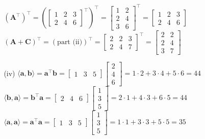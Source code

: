 \documentclass[11pt,letterpaper]{article}
\begin{document}
\begin{enumerate}
\begin{enumerate}
\begin{enumerate}
              $(\mathbf{A}^{\top})^{\top} = \left(\begin{bmatrix} 1 & 2 & 3 \\ 2 & 4 & 6 \end{bmatrix}^\top\right)^{\top} = \begin{bmatrix} 1 & 2 \\ 2 & 4 \\ 3 & 6 \end{bmatrix}^\top = \begin{bmatrix} 1 & 2 & 3 \\ 2 & 4 & 6 \end{bmatrix}$\\
              $(\mathbf{A} + \mathbf{C})^\top = \left(\text{part (ii)}\right)^\top = \begin{bmatrix} 2 & 2 & 3 \\ 2 & 4 & 7 \end{bmatrix}^\top = \begin{bmatrix} 2 & 2 \\ 2 & 4 \\ 3 & 7 \end{bmatrix}$
\item [(iv)] $\langle\mathbf{a}, \mathbf{b}\rangle = \mathbf{a}^\top\mathbf{b} = \begin{bmatrix} 1 & 3 & 5 \end{bmatrix} \begin{bmatrix} 2 \\ 4 \\ 6 \end{bmatrix} = 1 \cdot 2 + 3 \cdot 4 + 5 \cdot 6 = 44$\\
             $\langle\mathbf{b}, \mathbf{a}\rangle = \mathbf{b}^\top\mathbf{a} = \begin{bmatrix} 2 & 4 & 6 \end{bmatrix} \begin{bmatrix} 1 \\ 3 \\ 5 \end{bmatrix} = 2 \cdot 1 + 4 \cdot 3 + 6 \cdot 5 = 44$\\
             $\langle\mathbf{a}, \mathbf{a}\rangle = \mathbf{a}^\top\mathbf{a} = \begin{bmatrix} 1 & 3 & 5 \end{bmatrix} \begin{bmatrix} 1 \\ 3 \\ 5 \end{bmatrix} = 1 \cdot 1 + 3 \cdot 3 + 5 \cdot 5 = 35$\\

\end{enumerate}
\end{enumerate}
\end{enumerate}
\end{document}
